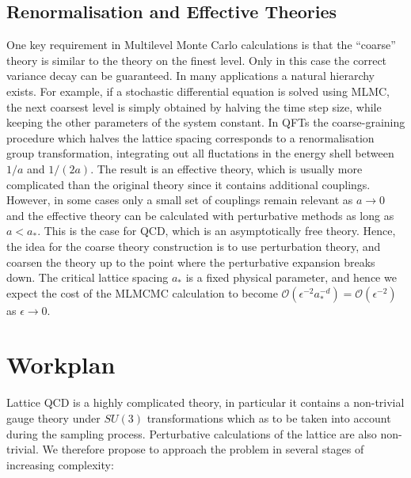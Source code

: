 \documentclass[11pt]{article}
\begin{document}
\subsection{Renormalisation and Effective Theories}
One key requirement in Multilevel Monte Carlo calculations is that the ``coarse'' theory is similar to the theory on the finest level. Only in this case the correct variance decay can be guaranteed. In many applications a natural hierarchy exists. For example, if a stochastic differential equation is solved using MLMC, the next coarsest level is simply obtained by halving the time step size, while keeping the other parameters of the system constant.
In QFTs the coarse-graining procedure which halves the lattice spacing corresponds to a renormalisation group transformation, integrating out all fluctations in the energy shell between $1/a$ and $1/(2a)$. The result is an effective theory, which is usually more complicated than the original theory since it contains additional couplings.
However, in some cases only a small set of couplings remain relevant as $a\rightarrow 0$ and the effective theory can be calculated with perturbative methods as long as $a<a_*$. This is the case for QCD, which is an asymptotically free theory. Hence, the idea for the coarse theory construction is to use perturbation theory, and coarsen the theory up to the point where the perturbative expansion breaks down. The critical lattice spacing $a_*$ is a fixed physical parameter, and hence we expect the cost of the MLMCMC calculation to become $\mathcal{O}(\epsilon^{-2}a_*^{-d})=\mathcal{O}(\epsilon^{-2})$ as $\epsilon\rightarrow 0$.
\section{Workplan}
Lattice QCD is a highly complicated theory, in particular it contains a non-trivial gauge theory under $SU(3)$ transformations which as to be taken into account during the sampling process. Perturbative calculations of the lattice are also non-trivial. We therefore propose to approach the problem in several stages of increasing complexity:
\end{document}
